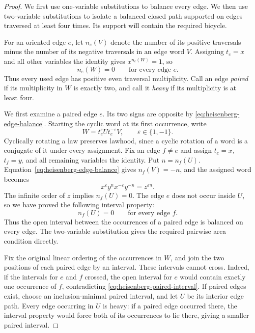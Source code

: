 \begin{proof}
We first use one-variable substitutions to balance every edge.  We
then use two-variable substitutions to isolate a balanced closed path
supported on edges traversed at least four times.  Its support will
contain the required bicycle.

For an oriented edge $e$, let $n_e(V)$ denote the number of its positive
traversals minus the number of its negative traversals in an edge word
$V$.  Assigning $t_e=x$ and all other variables the identity gives
$x^{n_e(W)}=1$, so
\begin{equation}
\label{eq:heisenberg-edge-balance}
  n_e(W)=0\qquad\text{for every edge }e.
\end{equation}
Thus every used edge has positive even traversal multiplicity.  Call an
edge \emph{paired} if its multiplicity in $W$ is exactly two, and call it
\emph{heavy} if its multiplicity is at least four.

We first examine a paired edge $e$.  Its two signs are opposite by
\eqref{eq:heisenberg-edge-balance}.  Starting the cyclic word at its first
occurrence, write
\[
  W=t_e^{\varepsilon}U t_e^{-\varepsilon}V,
  \qquad \varepsilon\in\{1,-1\}.
\]
Cyclically rotating a law preserves lawhood, since a cyclic rotation of
a word is a conjugate of it under every assignment.  Fix an edge $f\ne e$
and assign $t_e=x$, $t_f=y$, and all remaining variables the identity.
Put $n=n_f(U)$.  Equation~\eqref{eq:heisenberg-edge-balance} gives
$n_f(V)=-n$, and the assigned word becomes
\[
  x^{\varepsilon}y^n x^{-\varepsilon}y^{-n}
     =z^{\varepsilon n}.
\]
The infinite order of $z$ implies $n_f(U)=0$.  The edge $e$ does not occur
inside $U$, so we have proved the following interval property:
\begin{equation}
\label{eq:heisenberg-paired-interval}
  n_f(U)=0\qquad\text{for every edge }f.
\end{equation}
Thus the open interval between the occurrences of a paired edge is
balanced on every edge.  The two-variable substitution gives the
required pairwise area condition directly.

Fix the original linear ordering of the occurrences in $W$, and join the
two positions of each paired edge by an interval.  These intervals
cannot cross.  Indeed, if the intervals for $e$ and $f$ crossed, the open
interval for $e$ would contain exactly one occurrence of $f$, contradicting
\eqref{eq:heisenberg-paired-interval}.  If paired edges exist, choose an
inclusion-minimal paired interval, and let $U$ be its interior edge path.
Every edge occurring in $U$ is heavy: if a paired edge occurred there,
the interval property would force both of its occurrences to lie there,
giving a smaller paired interval.


\end{proof}
